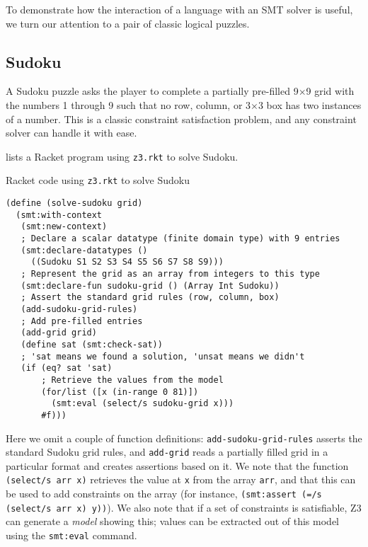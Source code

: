 To demonstrate how the interaction of a language with an SMT solver is useful, we
turn our attention to a pair of classic logical puzzles.

\subsection{Sudoku}

A Sudoku puzzle asks the player to complete a partially pre-filled 9$\times$9
grid with the numbers 1 through 9 such that no row, column, or 3$\times$3 box
has two instances of a number. This is a classic constraint satisfaction
problem, and any constraint solver can handle it with ease.

 lists a Racket program using \texttt{z3.rkt} to solve Sudoku.

\begin{program}
\caption{Racket code using \texttt{z3.rkt} to solve Sudoku}
\label{fig:sudoku}
\begin{verbatim}
(define (solve-sudoku grid)
  (smt:with-context
   (smt:new-context)
   ; Declare a scalar datatype (finite domain type) with 9 entries
   (smt:declare-datatypes ()
     ((Sudoku S1 S2 S3 S4 S5 S6 S7 S8 S9)))
   ; Represent the grid as an array from integers to this type
   (smt:declare-fun sudoku-grid () (Array Int Sudoku))
   ; Assert the standard grid rules (row, column, box)
   (add-sudoku-grid-rules)
   ; Add pre-filled entries
   (add-grid grid)
   (define sat (smt:check-sat))
   ; 'sat means we found a solution, 'unsat means we didn't
   (if (eq? sat 'sat)
       ; Retrieve the values from the model
       (for/list ([x (in-range 0 81)])
         (smt:eval (select/s sudoku-grid x)))
       #f)))
\end{verbatim}
\end{program}

Here we omit a couple of function definitions: \texttt{add-sudoku-grid-rules}
asserts the standard Sudoku grid rules, and \texttt{add-grid} reads a
partially filled grid in a particular format and creates assertions based on
it. We note that the function \texttt{(select/s arr x)} retrieves the value at
\texttt{x} from the array \texttt{arr}, and that this can be used to add
constraints on the array (for instance, \texttt{(smt:assert (=/s (select/s arr
x) y))}). We also note that if a set of constraints is satisfiable, Z3 can
generate a \textit{model} showing this; values can be extracted out of this
model using the \texttt{smt:eval} command.

